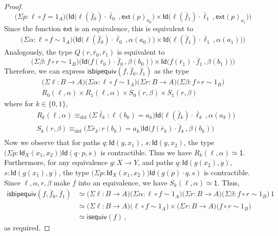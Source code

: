 \documentclass[reqno,10pt,a4paper,oneside]{amsart}
\numberwithin{equation}{section}
\theoremstyle{mythm}
\theoremstyle{mydef}
\theoremstyle{myrmk}
\newcommand{\deq}{\equiv}
\newcommand{\defeq}{\deq_{\mathrm{def}}}
\newcommand{\co}{\colon}
\newcommand{\comp}{\circ}
\newcommand{\isequiv}{\mathsf{isequiv}}
\newcommand{\ext}{\mathsf{ext}}
\newcommand{\ct}{\cdot}
\newcommand{\Id}{\mathsf{Id}}
\newcommand{\one}{\mathsf{1}}
\newcommand{\isbipequiv}{\mathsf{isbipequiv}}
\begin{document}
\begin{proof}
\[
\big(\Sigma p : \ell \comp f = 1_A \big) \Big(
\Id  \big( \ell (\bar{f}_0) \ct \bar{\ell}_0 \, ,  \ext(p)_{a_0} \big) 
\times 
\Id \big( \ell(\bar{f}_1) \ct \bar{\ell}_1 \, ,  \ext(p)_{a_1} \big)
\Big)
\]
Since the function $\ext$ is an equivalence, this is equivalent to
\begin{align*}
\big(\Sigma \alpha : \ell \comp f \sim 1_A \big) \Big(
\Id  \big( \ell (\bar{f}_0) \ct \bar{\ell}_0 \, ,  \alpha(a_0) \big) 
\times 
\Id \big( \ell(\bar{f}_1) \ct \bar{\ell}_1 \, ,  \alpha(a_1) \big)
\Big)
\end{align*}
Analogously, the type $Q(r,\bar{r}_0,\bar{r}_1)$ is equivalent to
\[
\big(\Sigma \beta : f \comp r \sim 1_B \big) 
\Big(
\Id  \big( f (\bar{r}_0) \ct \bar{f}_0 \, ,  \beta(b_0) \big) 
\times 
\Id \big( f(\bar{r}_1) \ct \bar{f}_1 \, ,  \beta(b_1) \big)
\Big)
\]
Therefore, we can express $\isbipequiv(f, \bar{f}_0, \bar{f}_1)$ as the type
\begin{multline*}
 \big(\Sigma \ell \co B \to  A \big) \big(\Sigma \alpha : \ell \comp f \sim 1_A \big)
  \big(\Sigma r \co B \to A \big) \big(\Sigma \beta : f \comp r \sim 1_B \big) \\
	R_0(\ell,\alpha) \times R_1(\ell,\alpha) \times S_0(r,\beta) \times S_1(r,\beta)
\end{multline*}
where for $k \in \{0,1\}$,
\begin{align*}
& R_k(\ell,\alpha) \defeq \big(\Sigma \bar{\ell}_k : \ell(b_k)=a_k \big) \Id \big( \ell (\bar{f}_k) \ct \bar{\ell}_k \, ,  \alpha(a_k) \big) \\
& S_k(r,\beta) \defeq \big(\Sigma \bar{r}_k : r(b_k)=a_k \big) \Id \big( f (\bar{r}_k) \ct \bar{f}_k \, ,  \beta(b_k) \big) \\
\end{align*}
Now we observe that for paths $q : \Id(y,x_1)$, $s : \Id(y,x_2)$, the type $\big(\Sigma p : \Id_X(x_1,x_2)\big) \Id(q \ct p,s)$ is contractible. Thus we have $R_k(\ell,\alpha) \simeq \one$.
Furthermore, for any equivalence $g : X \to Y$, and paths $q : \Id(g(x_2),y)$, $s : \Id(g(x_1),y)$, the type $\big(\Sigma p : \Id_X(x_1,x_2)\big) \Id(g(p) \ct q,s)$ is contractible. Since $\ell, \alpha, r, \beta$ make $f$ into an equivalence, we have $S_k(\ell,\alpha) \simeq \one$. Thus,
\begin{align*} 
\isbipequiv(f,\bar{f}_0, \bar{f}_1) 
  & \simeq   \big(\Sigma \ell \co B \to A \big) \big(\Sigma \alpha : \ell \comp f \sim 1_A \big) \big(\Sigma r  \co B \to A \big) 
 \big(\Sigma \beta \co f \comp r \sim 1_B \big) \, 1 \\
 & \simeq \big(\Sigma \ell \co B \to A \big)  \big( \ell \comp f \sim 1_A \big) \times 
 \big(\Sigma r  \co B \to A \big) \big( f \comp r \sim 1_B \big) \\
 & \simeq \isequiv(f) \, ,
\end{align*} 
as required.
\end{proof}
\end{document}
